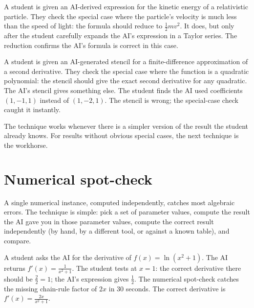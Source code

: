 \documentclass[11pt]{book}
\begin{document}
\begin{example}
A student is given an AI-derived expression for the kinetic energy of a relativistic particle. They check the special case where the particle's velocity is much less than the speed of light: the formula should reduce to $\frac{1}{2}mv^2$. It does, but only after the student carefully expands the AI's expression in a Taylor series. The reduction confirms the AI's formula is correct in this case.
\end{example}

\begin{example}
A student is given an AI-generated stencil for a finite-difference approximation of a second derivative. They check the special case where the function is a quadratic polynomial: the stencil should give the exact second derivative for any quadratic. The AI's stencil gives something else. The student finds the AI used coefficients $(1, -1, 1)$ instead of $(1, -2, 1)$. The stencil is wrong; the special-case check caught it instantly.
\end{example}

The technique works whenever there is a simpler version of the result the student already knows. For results without obvious special cases, the next technique is the workhorse.

\section{Numerical spot-check}

A single numerical instance, computed independently, catches most algebraic errors. The technique is simple: pick a set of parameter values, compute the result the AI gave you in those parameter values, compute the correct result independently (by hand, by a different tool, or against a known table), and compare.

\begin{example}
A student asks the AI for the derivative of $f(x) = \ln(x^2 + 1)$. The AI returns $f'(x) = \frac{1}{x^2 + 1}$. The student tests at $x = 1$: the correct derivative there should be $\frac{2}{2} = 1$; the AI's expression gives $\frac{1}{2}$. The numerical spot-check catches the missing chain-rule factor of $2x$ in 30 seconds. The correct derivative is $f'(x) = \frac{2x}{x^2 + 1}$.
\end{example}
\end{document}
